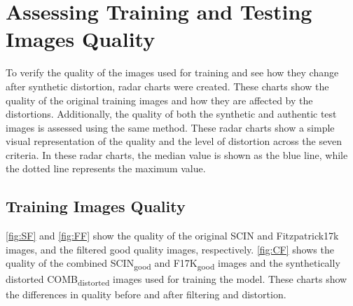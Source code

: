 \clearpage
\section{Assessing Training and Testing Images Quality}
\label{sec:TestingFilteredImages}
To verify the quality of the images used for training and see how they change after synthetic distortion, radar charts were created. These charts show the quality of the original training images and how they are affected by the distortions. Additionally, the quality of both the synthetic and authentic test images is assessed using the same method. These radar charts show a simple visual representation of the quality and the level of distortion across the seven criteria. In these radar charts, the median value is shown as the blue line, while the dotted line represents the maximum value. \par
\subsection{Training Images Quality}
\label{subsec:TrainingImagesQuality}
\autoref{fig:SF} and \autoref{fig:FF} show the quality of the original SCIN\autocite{SCIN} and Fitzpatrick17k\autocite{F17K} images, and the filtered good quality images, respectively. \autoref{fig:CF} shows the quality of the combined SCIN\textsubscript{good} and F17K\textsubscript{good} images and the synthetically distorted COMB\textsubscript{distorted} images used for training the model. These charts show the differences in quality before and after filtering and distortion.\par
\vspace{\baselineskip}


